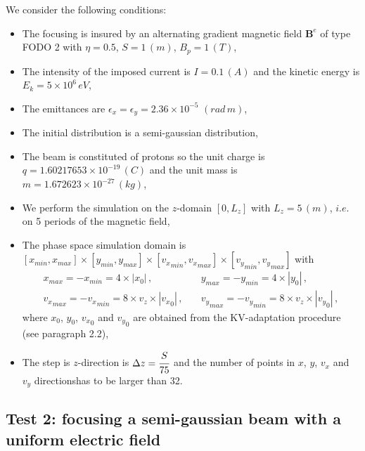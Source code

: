 \documentclass[10pt]{article}
\begin{document}
We consider the following conditions\footnotemark[3]:
\begin{itemize}
\item The focusing is insured by an alternating gradient magnetic field $\mathbf{B}^{e}$ of type FODO 2 with $\eta = 0.5$, $S = 1 \, (m)$, $B_{p} = 1\, (T)$,
\item The intensity of the imposed current is $I = 0.1 \, (A)$ and the kinetic energy is $E_{k} = 5\times 10^{6}\,eV$,
\item The emittances are $\epsilon_{x} = \epsilon_{y} = 2.36 \times 10^{-5} \, \,(rad\, m)$,
\item The initial distribution is a semi-gaussian distribution,
\item The beam is constituted of protons so the unit charge is $q = 1.60217653 \times 10^{-19} \, (C)$ and the unit mass is $m = 1.672623 \times 10^{-27} \, (kg)$,
\item We perform the simulation on the $z$-domain $[0,L_{z}]$ with $L_{z} = 5\, (m)$, $\textit{i.e.}$ on 5 periods of the magnetic field,
\item The phase space simulation domain is $[x_{min},x_{max}] \times [y_{min},y_{max}] \times [{v_{x}}_{min},{v_{x}}_{max}] \times [{v_{y}}_{min},{v_{y}}_{max}]$ with
\begin{equation}
\begin{array}{ll}
x_{max} = -x_{min} = 4 \times |x_{0}| \, ,\quad & y_{max} = -y_{min} = 4 \times |y_{0}| \, , \\
{v_{x}}_{max} = -{v_{x}}_{min} = 8 \times v_{z}\times |{v_{x}}_{0}| \, ,\quad & {v_{y}}_{max} = -{v_{y}}_{min} = 8 \times v_{z}\times |{v_{y}}_{0}| \, ,
\end{array}
\end{equation}
where $x_{0}$, $y_{0}$, ${v_{x}}_{0}$ and ${v_{y}}_{0}$ are obtained from the KV-adaptation procedure (see paragraph 2.2),
\item The step is $z$-direction is $\Delta z = \cfrac{S}{75}$ and the number of points in $x$, $y$, $v_{x}$ and $v_{y}$ directions\footnotemark[4] has to be larger than 32.
\end{itemize}




\subsection{Test 2: focusing a semi-gaussian beam with a uniform electric field}
\end{document}
